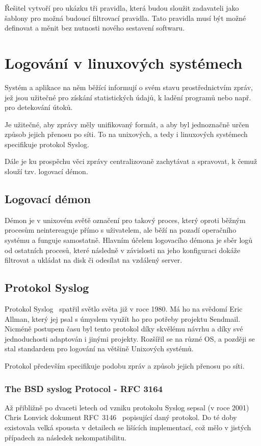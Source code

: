 \documentclass[thesis=B,czech]{FITthesis}[2012/06/26]
\begin{document}
Řešitel vytvoří pro ukázku tři pravidla, která budou sloužit zadavateli jako šablony pro možná budoucí filtrovací pravidla. Tato pravidla musí být možné definovat a měnit bez nutnosti nového sestavení softwaru.

\chapter{Logování v linuxových systémech}
Systém a aplikace na něm běžící informují o svém stavu prostřednictvím zpráv, jež jsou užitečné pro získání statistických údajů, k ladění programů nebo např. pro detekování útoků.

Je užitečné, aby zprávy měly unifikovaný formát, a aby byl jednoznačně určen způsob jejich přenosu po síti. To na unixových, a tedy i linuxových systémech specifikuje protokol Syslog.

Dále je ku prospěchu věci zprávy centralizovaně zachytávat a spravovat, k čemuž slouží tzv. logovací démon. 

\section{Logovací démon}
Démon je v unixovém světě označení pro takový proces, který oproti běžným procesům neintereaguje přímo s uživatelem, ale běží na pozadí operačního systému a funguje samostatně. Hlavním účelem logovacího démona je sběr logů od ostatních procesů, které následně v závislosti na jeho konfiguraci dokáže filtrovat a ukládat na disk či odesílat na vzdálený server.

\section{Protokol Syslog}
Protokol Syslog~\cite{NetworkAdmSurGuide} spatřil světlo světa již v roce 1980. Má ho na svědomí Eric Allman, který jej psal s úmyslem využít ho pro potřeby projektu Sendmail. Nicméně postupem času byl tento protokol díky skvělému návrhu a díky své jednoduchosti adaptován i jinými projekty. Rozšířil se na různé OS, a později se stal standardem pro logování na většině Unixových systémů.

Protokol především specifikuje podobu zpráv a způsob jejich přenosu po síti.

\subsection{The BSD syslog Protocol - RFC 3164}
Až přibližně po dvaceti letech od vzniku protokolu Syslog sepsal (v roce 2001) Chris Lonvick dokument RFC~3146~\cite{RFC3164} popisující daný protokol. Do té doby existovala velká spousta v detailech se lišících implementací, což mělo v jistých případech za následek nekompatibilitu.
\end{document}
